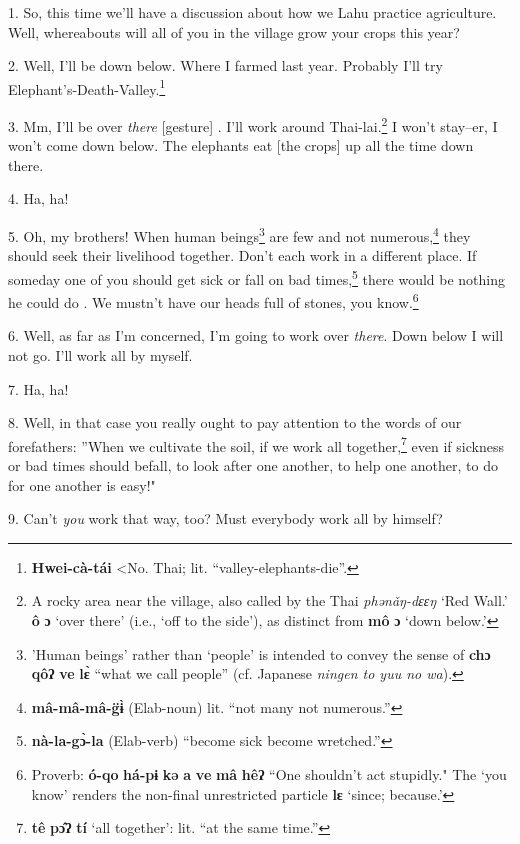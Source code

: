 \setcounter{footnote}{0}

1. So, this time we'll have a discussion about how we Lahu practice agriculture.
Well, whereabouts will all of you in the village grow your crops this year?

2. Well, I'll be down below. Where I farmed last year. Probably I'll try Elephant's-Death-Valley.\footnote{\textbf{Hwei-cà-tái} <No. Thai; lit. ``valley-elephants-die''.}

3. Mm, I'll be over \textit{there} [gesture] . I'll work around Thai-lai.\footnote{A rocky area near the village, also called by the Thai \textit{phənǎŋ-dɛɛŋ} `Red Wall.' \textbf{ô} \textbf{ɔ} `over there' (i.e., `off to the side'), as distinct from \textbf{mô} \textbf{ɔ} `down below.'}
I won't stay--er, I won't come down below. The elephants eat [the crops] up all
the time down there.

4. Ha, ha!

5. Oh, my brothers! When human beings\footnote{'Human beings' rather than `people' is intended to convey the sense of \textbf{chɔ} \textbf{qôʔ} \textbf{ve} \textbf{lɛ̀} ``what we call people'' (cf. Japanese \textit{ningen to yuu no wa}).} are few and not numerous,\footnote{\textbf{mâ-mâ-mâ-g̈ɨ̀} (Elab-noun) lit. ``not many not numerous.''} they should
seek their livelihood together. Don't each work in a different place. If someday
one of you should get sick or fall on bad times,\footnote{\textbf{nà-la-gɔ̀-la} (Elab-verb) ``become sick become wretched.''} there would be nothing he
could do . We mustn't have our heads full of stones, you know.\footnote{Proverb: \textbf{ó-qo} \textbf{há-pɨ} \textbf{kə} \textbf{a} \textbf{ve} \textbf{mâ} \textbf{hêʔ} ``One shouldn't act stupidly." The `you know' renders the non-final unrestricted particle \textbf{lɛ} `since; because.'}

6. Well, as far as I'm concerned, I'm going to work over \textit{there}. Down below
I will not go. I'll work all by myself.

7. Ha, ha!

8. Well, in that case you really ought to pay attention to the words of our forefathers:
''When we cultivate the soil, if we work all together,\footnote{\textbf{tê} \textbf{pɔ̂ʔ} \textbf{tí} `all together': lit. ``at the same time.''} even if sickness
or bad times should befall, to look after one another, to help one another, to
do for one another is easy!"

9. Can't \textit{you} work that way, too? Must everybody work all by himself?

